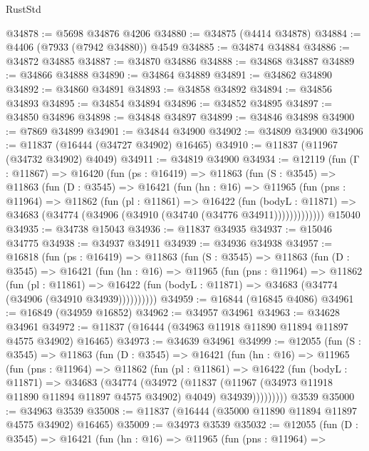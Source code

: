 \begin{lexlean}{RustStd}
\begin{coremodule}
{\begin{coremodule}
{{{{{{{{{{{{{{{{{{{{{{{{{{{{{{{{{{{{{{{{{{{{{{{{{{@34878 := @5698 @34876 @4206
@34880 := @34875 (@4414 @34878)
@34884 := @4406 (@7933 (@7942 @34880)) @4549
@34885 := @34874 @34884
@34886 := @34872 @34885
@34887 := @34870 @34886
@34888 := @34868 @34887
@34889 := @34866 @34888
@34890 := @34864 @34889
@34891 := @34862 @34890
@34892 := @34860 @34891
@34893 := @34858 @34892
@34894 := @34856 @34893
@34895 := @34854 @34894
@34896 := @34852 @34895
@34897 := @34850 @34896
@34898 := @34848 @34897
@34899 := @34846 @34898
@34900 := @7869 @34899
@34901 := @34844 @34900
@34902 := @34809 @34900
@34906 := @11837 (@16444 (@34727 @34902) @16465)
@34910 := @11837 (@11967 (@34732 @34902) @4049)
@34911 := @34819 @34900
@34934 := @12119
    (fun (Γ : @11867) =>
    @16420
      (fun (ps : @16419) =>
      @11863
        (fun (S : @3545) =>
        @11863
          (fun (D : @3545) =>
          @16421
            (fun (hn : @16) =>
            @11965
              (fun (pns : @11964) =>
              @11862
                (fun (pl : @11861) =>
                @16422
                  (fun (bodyL : @11871) =>
                  @34683 (@34774 (@34906 (@34910 (@34740 (@34776 @34911)))))))))))))
    @15040
@34935 := @34738 @15043
@34936 := @11837 @34935
@34937 := @15046 @34775
@34938 := @34937 @34911
@34939 := @34936 @34938
@34957 := @16818
    (fun (ps : @16419) =>
    @11863
      (fun (S : @3545) =>
      @11863
        (fun (D : @3545) =>
        @16421
          (fun (hn : @16) =>
          @11965
            (fun (pns : @11964) =>
            @11862
              (fun (pl : @11861) =>
              @16422 (fun (bodyL : @11871) => @34683 (@34774 (@34906 (@34910 @34939))))))))))
@34959 := @16844 (@16845 @4086)
@34961 := @16849 (@34959 @16852)
@34962 := @34957 @34961
@34963 := @34628 @34961
@34972 := @11837 (@16444 (@34963 @11918 @11890 @11894 @11897 @4575 @34902) @16465)
@34973 := @34639 @34961
@34999 := @12055
    (fun (S : @3545) =>
    @11863
      (fun (D : @3545) =>
      @16421
        (fun (hn : @16) =>
        @11965
          (fun (pns : @11964) =>
          @11862
            (fun (pl : @11861) =>
            @16422
              (fun (bodyL : @11871) =>
              @34683
                (@34774
                  (@34972
                    (@11837
                      (@11967 (@34973 @11918 @11890 @11894 @11897 @4575 @34902) @4049)
                      @34939)))))))))
    @3539
@35000 := @34963 @3539
@35008 := @11837 (@16444 (@35000 @11890 @11894 @11897 @4575 @34902) @16465)
@35009 := @34973 @3539
@35032 := @12055
    (fun (D : @3545) =>
    @16421
      (fun (hn : @16) =>
      @11965
        (fun (pns : @11964) =>
}}}}}}}}}}}}}}}}}}}}}}}}}}}}}}}}}}}}}}}}}}}}}}}}}}
\end{coremodule}}
\end{coremodule}
\end{lexlean}
